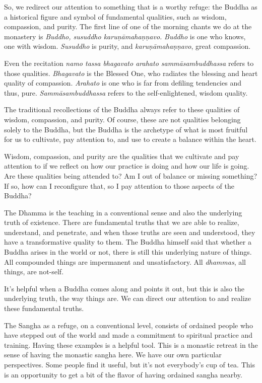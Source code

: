 So, we redirect our attention to something that is a worthy refuge: the
Buddha as a historical figure and symbol of fundamental qualities, such
as wisdom, compassion, and purity. The first line of one of the morning
chants we do at the monastery is \emph{Buddho, susuddho
karuṇāmahaṇṇavo.} \emph{Buddho} is one who knows, one with wisdom.
\emph{Susuddho} is purity, and \emph{karuṇāmahaṇṇavo}, great compassion.

Even the recitation \emph{namo tassa bhagavato arahato
sammāsambuddhassa} refers to those qualities. \emph{Bhagavato} is the
Blessed One, who radiates the blessing and heart quality of compassion.
\emph{Arahato} is one who is far from defiling tendencies and thus,
pure. \emph{Sammāsambuddhassa} refers to the self-enlightened, wisdom
quality.

The traditional recollections of the Buddha always refer to these
qualities of wisdom, compassion, and purity. Of course, these are not
qualities belonging solely to the Buddha, but the Buddha is the
archetype of what is most fruitful for us to cultivate, pay attention
to, and use to create a balance within the heart.

Wisdom, compassion, and purity are the qualities that we cultivate and
pay attention to if we reflect on how our practice is doing and how our
life is going. Are these qualities being attended to? Am I out of
balance or missing something? If so, how can I reconfigure that, so I
pay attention to those aspects of the Buddha?

The Dhamma is the teaching in a conventional sense and also the
underlying truth of existence. There are fundamental truths that we are
able to realize, understand, and penetrate, and when those truths are
seen and understood, they have a transformative quality to them. The
Buddha himself said that whether a Buddha arises in the world or not,
there is still this underlying nature of things. All compounded things
are impermanent and unsatisfactory. All \emph{dhammas}, all things, are
not-self.

It’s helpful when a Buddha comes along and points it out, but this is
also the underlying truth, the way things are. We can direct our
attention to and realize these fundamental truths.

The Sangha as a refuge, on a conventional level, consists of ordained
people who have stepped out of the world and made a commitment to
spiritual practice and training. Having these examples is a helpful
tool. This is a monastic retreat in the sense of having the monastic
sangha here. We have our own particular perspectives. Some people find
it useful, but it’s not everybody’s cup of tea. This is an opportunity
to get a bit of the flavor of having ordained sangha nearby.

